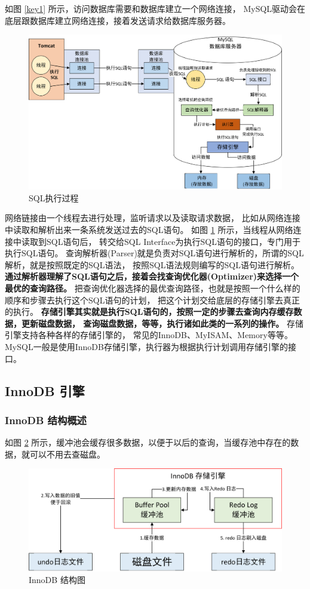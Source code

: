 \documentclass[a4,10pt]{ctexart}
\begin{document}
如图 \ref{key1} 所示，访问数据库需要和数据库建立一个网络连接，
MySQL驱动会在底层跟数据库建立网络连接，接着发送请求给数据库服务器。

\begin{figure}[htbp]
	\centering
	\includegraphics[width=.6\textwidth]{img/mysql/1/executeSQL.png}
	\caption{SQL执行过程}
	\label{key2}
\end{figure}

网络链接由一个线程去进行处理，监听请求以及读取请求数据，
比如从网络连接中读取和解析出来一条系统发送过去的SQL语句。
如图 \ref{key2} 所示，当线程从网络连接中读取到SQL语句后，
转交给SQL Interface为执行SQL语句的接口，专门用于执行SQL语句。
查询解析器(Parser)就是负责对SQL语句进行解析的，所谓的SQL解析，就是按照既定的SQL语法，
按照SQL语法规则编写的SQL语句进行解析。
\textbf{通过解析器理解了SQL语句之后，接着会找查询优化器(Optimizer)来选择一个最优的查询路径。} 
把查询优化器选择的最优查询路径，也就是按照一个什么样的顺序和步骤去执行这个SQL语句的计划，
把这个计划交给底层的存储引擎去真正的执行。
\textbf{存储引擎其实就是执行SQL语句的，按照一定的步骤去查询内存缓存数据，更新磁盘数据，
查询磁盘数据，等等，执行诸如此类的一系列的操作。} 存储引擎支持各种各样的存储引擎的，
常见的InnoDB、MyISAM、Memory等等。MySQL一般是使用InnoDB存储引擎，执行器为根据执行计划调用存储引擎的接口。

\subsection{InnoDB 引擎}
\subsubsection{InnoDB 结构概述}

如图 \ref{key3} 所示，缓冲池会缓存很多数据，以便于以后的查询，当缓存池中存在的数据，就可以不用去查磁盘。

\begin{figure}[htbp]
	\centering
	\includegraphics[width=.6\textwidth]{img/mysql/2/bufferPool.png}
	\caption{InnoDB 结构图}
	\label{key3}
\end{figure}
\end{document}
